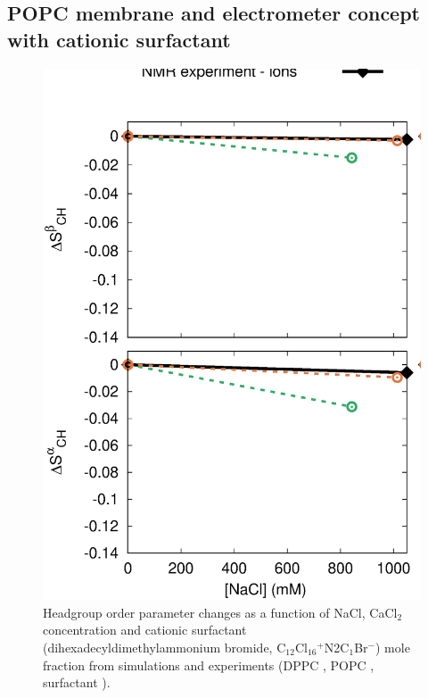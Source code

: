 \documentclass[aip,jcp,twocolumn]{revtex4}
\begin{document}
\subsection{POPC membrane and electrometer concept with cationic surfactant}

\begin{figure}[tbp]
  \centering
  \includegraphics[width=16.0cm]{../Fig/OrdParChanges_NaCl_CaCl2_surf.eps}
  \caption{\label{OrderParameterCHANGESnewMODELS}
    Headgroup order parameter changes as a function of NaCl, CaCl$_2$ concentration and
    cationic surfactant (dihexadecyldimethylammonium bromide, C$_{12}$Cl$_{16}$$^+$N2C$_1$Br$^-$) mole fraction
    from simulations and experiments (DPPC \cite{akutsu81}, POPC \cite{altenbach84}, surfactant \cite{scherer89}).
  }
\end{figure}
\end{document}
